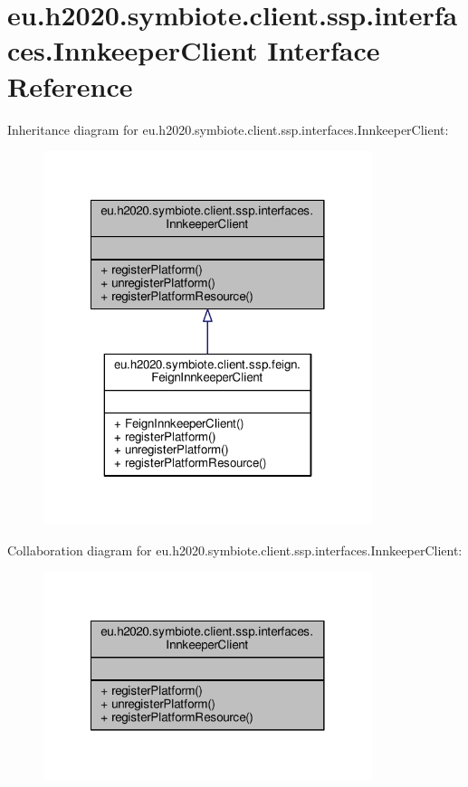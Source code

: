 \hypertarget{interfaceeu_1_1h2020_1_1symbiote_1_1client_1_1ssp_1_1interfaces_1_1InnkeeperClient}{}\section{eu.\+h2020.\+symbiote.\+client.\+ssp.\+interfaces.\+Innkeeper\+Client Interface Reference}
\label{interfaceeu_1_1h2020_1_1symbiote_1_1client_1_1ssp_1_1interfaces_1_1InnkeeperClient}


Inheritance diagram for eu.\+h2020.\+symbiote.\+client.\+ssp.\+interfaces.\+Innkeeper\+Client\+:\nopagebreak
\begin{figure}[H]
\begin{center}
\leavevmode
\includegraphics[width=272pt]{interfaceeu_1_1h2020_1_1symbiote_1_1client_1_1ssp_1_1interfaces_1_1InnkeeperClient__inherit__graph}
\end{center}
\end{figure}


Collaboration diagram for eu.\+h2020.\+symbiote.\+client.\+ssp.\+interfaces.\+Innkeeper\+Client\+:\nopagebreak
\begin{figure}[H]
\begin{center}
\leavevmode
\includegraphics[width=272pt]{interfaceeu_1_1h2020_1_1symbiote_1_1client_1_1ssp_1_1interfaces_1_1InnkeeperClient__coll__graph}
\end{center}
\end{figure}
